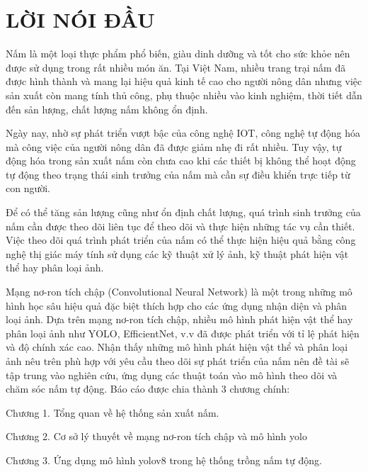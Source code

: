 
\chapter*{\hfill LỜI NÓI ĐẦU \hfill}
{}

Nấm là một loại thực phẩm phổ biến, giàu dinh dưỡng và tốt cho sức khỏe nên được sử dụng trong rất nhiều món ăn. Tại Việt Nam, nhiều trang trại nấm đã được hình thành và mang lại hiệu quả kinh tế cao cho người nông dân nhưng việc sản xuất còn mang tính thủ công, phụ thuộc nhiều vào kinh nghiệm, thời tiết dẫn đến sản lượng, chất lượng nấm không ổn định.

Ngày nay, nhờ sự phát triển vượt bậc của công nghệ IOT, công nghệ tự động hóa mà công việc của người nông dân đã được giảm nhẹ đi rất nhiều. Tuy vậy, tự động hóa trong sản xuất nấm còn chưa cao khi các thiết bị không thể hoạt động tự động theo trạng thái sinh trưởng của nấm mà cần sự điều khiển trực tiếp từ con người.

Để có thể tăng sản lượng cũng như ổn định chất lượng, quá trình sinh trưởng của nấm cần được theo dõi liên tục để theo dõi và thực hiện những tác vụ cần thiết. Việc theo dõi quá trình phát triển của nấm có thể thực hiện hiệu quả bằng công nghệ thị giác máy tính sử dụng các kỹ thuật xử lý ảnh, kỹ thuật phát hiện vật thể hay phân loại ảnh.

Mạng nơ-ron tích chập (Convolutional Neural Network) là một trong những mô hình học sâu hiệu quả đặc biệt thích hợp cho các ứng dụng nhận diện và phân loại ảnh. Dựa trên mạng nơ-ron tích chập, nhiều mô hình phát hiện vật thể hay phân loại ảnh như YOLO, EfficientNet, v.v đã được phát triển với tỉ lệ phát hiện và độ chính xác cao. Nhận thấy những mô hình phát hiện vật thể và phân loại ảnh nêu trên phù hợp với yêu cầu theo dõi sự phát triển của nấm nên đề tài sẽ tập trung vào nghiên cứu, ứng dụng các thuật toán vào mô hình theo dõi và chăm sóc nấm tự động. Báo cáo được chia thành 3 chương chính:

\hspace{1cm}Chương 1. Tổng quan về hệ thống sản xuất nấm.

\hspace{1cm}Chương 2. Cơ sở lý thuyết về mạng nơ-ron tích chập và mô hình yolo

\hspace{1cm}Chương 3. Ứng dụng mô hình yolov8 trong hệ thống trồng nấm tự động.



